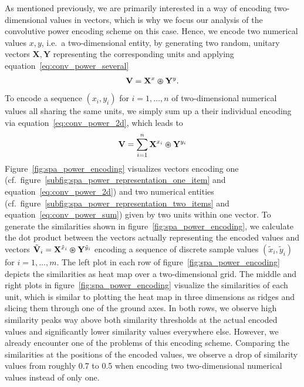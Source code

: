 As mentioned previously, we are primarily interested in a way of encoding two-dimensional values in vectors, which is why we focus our analysis of the convolutive power encoding scheme on this case.
Hence, we encode two numerical values $x,y$, i.e.\ a two-dimensional entity, by generating two random, unitary vectors $ \mathbf{X}, \mathbf{Y} $ representing the corresponding units and applying equation~\eqref{eq:conv_power_several} 
\begin{equation}
\label{eq:conv_power_2d}
\mathbf{V} = \mathbf{X}^{x} \varoast \mathbf{Y}^{y}.
\end{equation}
To encode a sequence $ \left(x_{i}, y_{i}\right) $ for $i=1, \ldots, n$ of two-dimensional numerical values all sharing the same units, we simply sum up a their individual encoding via equation~\eqref{eq:conv_power_2d}, which leads to
\begin{equation}
\label{eq:conv_power_sum}
\mathbf{V} = \sum\limits_{i=1}^{n} \mathbf{X}^{x_i} \varoast \mathbf{Y}^{y_i}
\end{equation}
Figure~\ref{fig:spa_power_encoding} visualizes vectors encoding one (cf.\ figure~\ref{subfig:spa_power_representation_one_item} and equation~\eqref{eq:conv_power_2d}) and two numerical entities (cf.\ figure~\ref{subfig:spa_power_representation_two_items} and equation~\eqref{eq:conv_power_sum}) given by two units within one vector.
To generate the similarities shown in figure~\ref{fig:spa_power_encoding}, we calculate the dot product between the vectors actually representing the encoded values and vectors $ \tilde{\mathbf{V}}_{i} = \mathbf{X}^{\tilde{x}_{i}} \varoast \mathbf{Y}^{\tilde{y}_i} $ encoding a sequence of discrete sample values $ \left( \tilde{x}_{i}, \tilde{y}_{i} \right)$ for $i=1, \ldots, m$.
The left plot in each row of figure~\ref{fig:spa_power_encoding} depicts the similarities as heat map over a two-dimensional grid. 
The middle and right plots in figure~\ref{fig:spa_power_encoding} visualize the similarities of each unit, which is similar to plotting the heat map in three dimensions as ridges and slicing them through one of the ground axes.
In both rows, we observe high similarity peaks way above both similarity thresholds at the actual encoded values and significantly lower similarity values everywhere else.
However, we already encounter one of the problems of this encoding scheme.
Comparing the similarities at the positions of the encoded values, we observe a drop of similarity values from roughly \num{0.7} to \num{0.5} when encoding two two-dimensional numerical values instead of only one.
